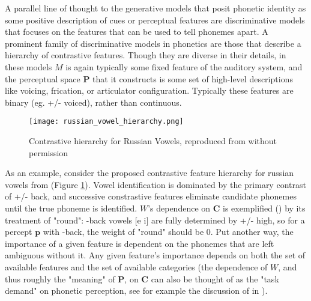 \begin{multicols}{2}

A parallel line of thought to the generative models that posit phonetic identity as some positive description of cues or perceptual features are discriminative models that focuses on the features that can be used to tell phonemes apart. A prominent family of discriminative models in phonetics are those that describe a hierarchy of contrastive features\cite{Dresher2008,clementsFeatureOrganization2006,halleFeatureSpreadingRepresentation2000}. Though they are diverse in their details, in these models $M$ is again typically some fixed feature of the auditory system, and the perceptual space $\mathbf{P}$ that it constructs is some set of high-level descriptions like voicing, frication, or articulator configuration. Typically these features are binary (eg. +/- voiced), rather than continuous.

\begin{figure}[H]
\texttt{[image: russian\_vowel\_hierarchy.png]}
\caption{Contrastive hierarchy for Russian Vowels, reproduced from \cite{iosadVowelReductionRussian2012} without permission}
\label{fig:hierarchy}
\end{figure}

As an example, consider the proposed contrastive feature hierarchy for russian vowels from \cite{iosadVowelReductionRussian2012} (Figure \ref{fig:hierarchy}). Vowel identification is dominated by the primary contrast of +/- back, and successive constrastive features eliminate candidate phonemes until the true phoneme is identified. $W$'s dependence on $\mathbf{C}$ is exemplified () by its treatment of "round": -back vowels [e i] are fully determined by +/- high, so for a percept $\mathbf{p}$ with -back, the weight of "round" should be 0. Put another way, the importance of a given feature is dependent on the phonemes that are left ambiguous without it. Any given feature's importance depends on both the set of available features and the set of available categories (the dependence of $W$, and thus roughly the "meaning" of $\mathbf{P}$, on $\mathbf{C}$ can also be thought of as the "task demand" on phonetic perception, see for example the discussion of \cite{leeExtendingALCOVEModel2002} in \cite{navarroDevilDeepBlue2019}). 



\end{multicols}
